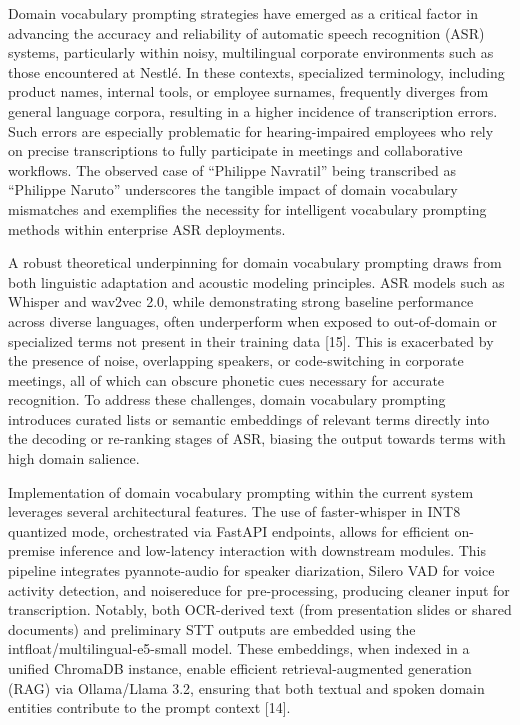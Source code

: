 \documentclass[12pt,a4paper]{article}
\begin{document}
Domain vocabulary prompting strategies have emerged as a critical factor in advancing the accuracy and reliability of automatic speech recognition (ASR) systems, particularly within noisy, multilingual corporate environments such as those encountered at Nestlé. In these contexts, specialized terminology, including product names, internal tools, or employee surnames, frequently diverges from general language corpora, resulting in a higher incidence of transcription errors. Such errors are especially problematic for hearing-impaired employees who rely on precise transcriptions to fully participate in meetings and collaborative workflows. The observed case of “Philippe Navratil” being transcribed as “Philippe Naruto” underscores the tangible impact of domain vocabulary mismatches and exemplifies the necessity for intelligent vocabulary prompting methods within enterprise ASR deployments.


A robust theoretical underpinning for domain vocabulary prompting draws from both linguistic adaptation and acoustic modeling principles. ASR models such as Whisper and wav2vec 2.0, while demonstrating strong baseline performance across diverse languages, often underperform when exposed to out-of-domain or specialized terms not present in their training data [15]. This is exacerbated by the presence of noise, overlapping speakers, or code-switching in corporate meetings, all of which can obscure phonetic cues necessary for accurate recognition. To address these challenges, domain vocabulary prompting introduces curated lists or semantic embeddings of relevant terms directly into the decoding or re-ranking stages of ASR, biasing the output towards terms with high domain salience.


Implementation of domain vocabulary prompting within the current system leverages several architectural features. The use of faster-whisper in INT8 quantized mode, orchestrated via FastAPI endpoints, allows for efficient on-premise inference and low-latency interaction with downstream modules. This pipeline integrates pyannote-audio for speaker diarization, Silero VAD for voice activity detection, and noisereduce for pre-processing, producing cleaner input for transcription. Notably, both OCR-derived text (from presentation slides or shared documents) and preliminary STT outputs are embedded using the intfloat/multilingual-e5-small model. These embeddings, when indexed in a unified ChromaDB instance, enable efficient retrieval-augmented generation (RAG) via Ollama/Llama 3.2, ensuring that both textual and spoken domain entities contribute to the prompt context [14].
\end{document}

